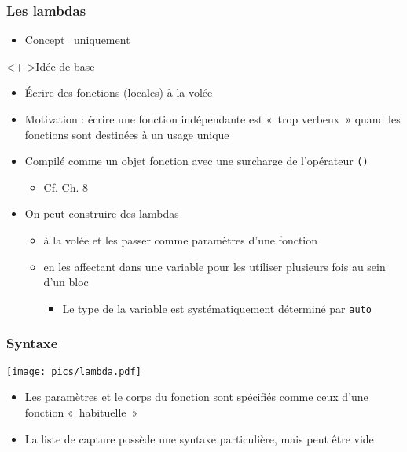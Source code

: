 \begin{frame}
\frametitle{Les lambdas}
\begin{itemize}[<+->]
\item Concept \cpp\ uniquement
\end{itemize}
\begin{exampleblock}<+->{Idée de base}
	\begin{itemize}[<+->]
	\item Écrire des fonctions (locales) à la volée
	\end{itemize}
\end{exampleblock}
\begin{itemize}[<+->]
\item Motivation : écrire une fonction indépendante est «~trop verbeux~» quand les fonctions sont destinées à un usage unique
\item Compilé comme un objet fonction avec une surcharge de l'opérateur \texttt{()}
	\begin{itemize}
	\item Cf. Ch. 8
	\end{itemize}
\item On peut construire des lambdas 
	\begin{itemize}
	\item à la volée et les passer comme paramètres d'une fonction
	\item en les affectant dans une variable pour les utiliser plusieurs fois au sein d'un bloc
		\begin{itemize}
		\item Le type de la variable est systématiquement déterminé par \lstinline|auto|
		\end{itemize}
	\end{itemize}
\end{itemize}
\end{frame}

\begin{frame}
\frametitle{Syntaxe}
\begin{center}
\texttt{[image: pics/lambda.pdf]}
\end{center}
\begin{itemize}
\item Les paramètres et le corps du fonction sont spécifiés comme ceux d'une fonction «~habituelle~»
\item La liste de capture possède une syntaxe particulière, mais peut être vide
\end{itemize}
\end{frame}

